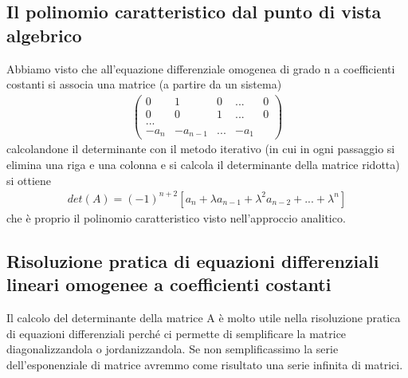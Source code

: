 \documentclass[10pt,a4paper]{article}
\begin{document}
\subsection{Il polinomio caratteristico dal punto di vista algebrico}
Abbiamo visto che all'equazione differenziale omogenea di grado n a coefficienti costanti si associa una matrice (a partire da un sistema)
\begin{align*}
	\begin{pmatrix}
		0&1&0&...&0\\
		0&0&1&...&0\\
		...\\
		-a_n&-a_{n-1}&...&-a_1
	\end{pmatrix}
\end{align*}
calcolandone il determinante con il metodo iterativo (in cui in ogni passaggio si elimina una riga e una colonna e si calcola il determinante della matrice ridotta) si ottiene
\begin{align*}
det(A) = (-1)^{n+2}[a_n +\lambda a_{n-1}+\lambda^2 a_{n-2}+...+\lambda^n]
\end{align*}
che è proprio il polinomio caratteristico visto nell'approccio analitico.
\subsection{Risoluzione pratica di equazioni differenziali lineari omogenee a coefficienti costanti}
Il calcolo del determinante della matrice A è molto utile nella risoluzione pratica di equazioni differenziali perché ci permette di semplificare la matrice diagonalizzandola o jordanizzandola. Se non semplificassimo la serie dell'esponenziale di matrice avremmo come risultato una serie infinita di matrici. 
\end{document}
